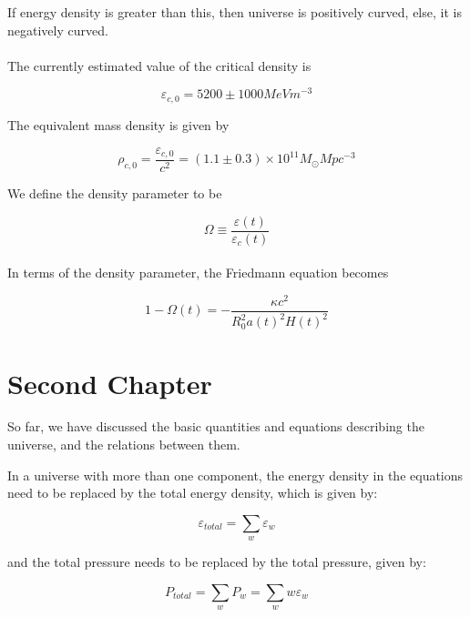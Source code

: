 \documentclass[a4,10pt,oneside]{report}
\begin{document}
    If energy density is greater than this, then universe is positively curved, else, it is negatively curved. 
    \\ \\
    The currently estimated value of the critical density is 
    
    \begin{equation}
	    \varepsilon_{c,0} = 5200 \pm 1000 MeV m^{-3}
    \end{equation}
    
    The equivalent mass density is given by
    
    \begin{equation}
	    \rho_{c,0}= \frac{\varepsilon_{c,0}}{c^2} = (1.1 \pm 0.3) \times 10^{11} M_\odot Mpc^{-3}
    \end{equation}
    
    We define the density parameter to be 
    
   \begin{equation}
	   \Omega \equiv \frac{\varepsilon(t)}{\varepsilon_c(t)}
   \end{equation}
   \\
  
   In terms of the density parameter, the Friedmann equation becomes
   
   \begin{equation}
	   1-\Omega(t) = -\frac{\kappa c^2}{R_0^2 a(t)^2 H(t)^2}
   \end{equation}
   
   \chapter{Second Chapter}
   
   So far, we have discussed the basic quantities and equations describing the universe, and the relations between them.
   
   In a universe with more than one component, the energy density in the equations need to be replaced by the total energy density, which is given by:
   
   \begin{equation}
	   \varepsilon_{total} = \sum_{w} \varepsilon_w
   \end{equation}
   
   and the total pressure needs to be replaced by the total pressure, given by:
   
   \begin{equation}
	   P_{total}=\sum_{w} P_w = \sum_{w} w\varepsilon_w
   \end{equation}
   
\end{document}
